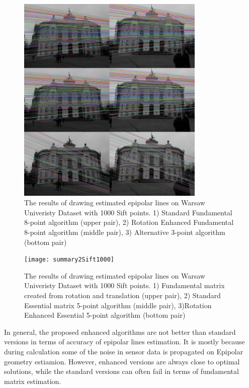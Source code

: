 \begin{figure}[b!]
    \centering
    \includegraphics[width=0.8\textwidth]{summary1Sift1000}
    \caption{The results of drawing estimated epipolar lines on Warsaw Univeristy Dataset with 1000 Sift points. 1) Standard Fundamental 8-point algorithm (upper pair), 2) Rotation Enhanced Fundamental 8-point algorithm (middle pair), 3) Alternative 3-point algorithm (bottom pair) }
    \label{fig:SummaryEpiLines11000}
\end{figure}
\begin{figure}[ht!]
    \centering
    \texttt{[image: summary2Sift1000]}
    \caption{The results of drawing estimated epipolar lines on Warsaw Univeristy Dataset with 1000 Sift points. 1) Fundamental matrix created from rotation and translation (upper pair), 2) Standard Essential matrix 5-point algorithm (middle pair), 3)Rotation Enhanced Essential 5-point algorithm (bottom pair) }
    \label{fig:SummaryEpiLines21000}
\end{figure}
In general, the proposed enhanced algorithms are not better than standard versions in terms of accuracy of epipolar lines estimation. It is mostly because during calculation some of the noise in sensor data is propagated on Epipolar geometry estiamion. However, enhanced versions are always close to optimal solutions, while the standard versions can often fail in terms of fundamental matrix estimation.
\clearpage

